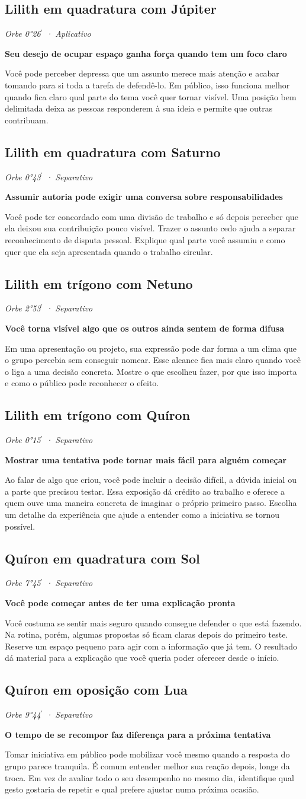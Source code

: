 \documentclass[11pt,a4paper]{article}
\newcommand{\leitura}[3]{\subsection{#1}\textit{#2}\par #3}
\newcommand{\subtituloleitura}[1]{\textbf{#1}\par\nopagebreak[4]}
\begin{document}
\leitura{Lilith em quadratura com Júpiter}{Orbe 0°26\ensuremath{^{\prime}} · Aplicativo}{
\subtituloleitura{Seu desejo de ocupar espaço ganha força quando tem um foco claro}
Você pode perceber depressa que um assunto merece mais atenção e acabar tomando para si toda a tarefa de defendê-lo. Em público, isso funciona melhor quando fica claro qual parte do tema você quer tornar visível. Uma posição bem delimitada deixa as pessoas responderem à sua ideia e permite que outras contribuam.
}

\leitura{Lilith em quadratura com Saturno}{Orbe 0°43\ensuremath{^{\prime}} · Separativo}{
\subtituloleitura{Assumir autoria pode exigir uma conversa sobre responsabilidades}
Você pode ter concordado com uma divisão de trabalho e só depois perceber que ela deixou sua contribuição pouco visível. Trazer o assunto cedo ajuda a separar reconhecimento de disputa pessoal. Explique qual parte você assumiu e como quer que ela seja apresentada quando o trabalho circular.
}

\leitura{Lilith em trígono com Netuno}{Orbe 2°53\ensuremath{^{\prime}} · Separativo}{
\subtituloleitura{Você torna visível algo que os outros ainda sentem de forma difusa}
Em uma apresentação ou projeto, sua expressão pode dar forma a um clima que o grupo percebia sem conseguir nomear. Esse alcance fica mais claro quando você o liga a uma decisão concreta. Mostre o que escolheu fazer, por que isso importa e como o público pode reconhecer o efeito.
}

\leitura{Lilith em trígono com Quíron}{Orbe 0°15\ensuremath{^{\prime}} · Separativo}{
\subtituloleitura{Mostrar uma tentativa pode tornar mais fácil para alguém começar}
Ao falar de algo que criou, você pode incluir a decisão difícil, a dúvida inicial ou a parte que precisou testar. Essa exposição dá crédito ao trabalho e oferece a quem ouve uma maneira concreta de imaginar o próprio primeiro passo. Escolha um detalhe da experiência que ajude a entender como a iniciativa se tornou possível.
}

\leitura{Quíron em quadratura com Sol}{Orbe 7°45\ensuremath{^{\prime}} · Separativo}{
\subtituloleitura{Você pode começar antes de ter uma explicação pronta}
Você costuma se sentir mais seguro quando consegue defender o que está fazendo. Na rotina, porém, algumas propostas só ficam claras depois do primeiro teste. Reserve um espaço pequeno para agir com a informação que já tem. O resultado dá material para a explicação que você queria poder oferecer desde o início.
}

\leitura{Quíron em oposição com Lua}{Orbe 9°44\ensuremath{^{\prime}} · Separativo}{
\subtituloleitura{O tempo de se recompor faz diferença para a próxima tentativa}
Tomar iniciativa em público pode mobilizar você mesmo quando a resposta do grupo parece tranquila. É comum entender melhor sua reação depois, longe da troca. Em vez de avaliar todo o seu desempenho no mesmo dia, identifique qual gesto gostaria de repetir e qual prefere ajustar numa próxima ocasião.
}
\end{document}
